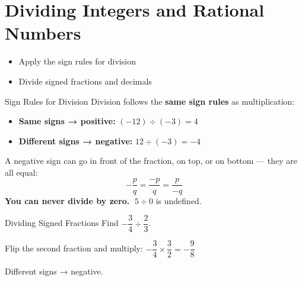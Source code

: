 \section{Dividing Integers and Rational Numbers}

\begin{learningGoals}
\begin{itemize}
    \item Apply the sign rules for division
    \item Divide signed fractions and decimals
\end{itemize}
\end{learningGoals}

\begin{conceptBox}{Sign Rules for Division}
Division follows the \textbf{same sign rules} as multiplication:
\begin{itemize}[leftmargin=*]
    \item \textbf{Same signs → positive:} $(-12) \div (-3) = 4$
    \item \textbf{Different signs → negative:} $12 \div (-3) = -4$
\end{itemize}
A negative sign can go in front of the fraction, on top, or on bottom — they are all equal:
$$-\frac{p}{q} = \frac{-p}{q} = \frac{p}{-q}$$
\textbf{You can never divide by zero.} $\;5 \div 0$ is undefined.
\end{conceptBox}

\begin{workedExample}{Dividing Signed Fractions}
Find $-\dfrac{3}{4} \div \dfrac{2}{3}$.

Flip the second fraction and multiply: $-\dfrac{3}{4} \times \dfrac{3}{2} = -\dfrac{9}{8}$

Different signs → negative.
\end{workedExample}


